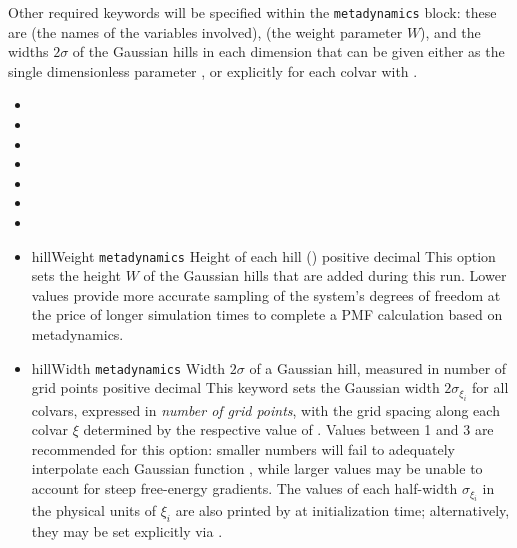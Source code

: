 Other required keywords will be specified within the \texttt{metadynamics} block: these are  (the names of the variables involved),  (the weight parameter $W$), and the widths $2\sigma$ of the Gaussian hills in each dimension that can be given either as the single dimensionless parameter , or explicitly for each colvar with .

\begin{itemize}

\item {}
\item {}
\item {}
\item {}
\item {}
\item {}
\item {}

\item %
  \key
    {hillWeight}{%
    \texttt{metadynamics}}{%
    Height of each hill (\energyunit)}{%
    positive decimal}{%
    This option sets the height $W$ of the Gaussian hills that are added during this run.
    Lower values provide more accurate sampling of the system's degrees of freedom at the price of longer simulation times to complete a PMF calculation based on metadynamics.}

\item %
  \key
    {hillWidth}{%
    \texttt{metadynamics}}{%
    Width $2\sigma$ of a Gaussian hill, measured in number of grid points}{%
    positive decimal}{%
    This keyword sets the Gaussian width $2\sigma_{\xi_{i}}$ for all colvars, expressed in \emph{number of grid points}, with the grid spacing along each colvar $\xi$ determined by the respective value of .
    Values between 1 and 3 are recommended for this option: smaller numbers will fail to adequately interpolate each Gaussian function \cite{Fiorin2013}, while larger values may be unable to account for steep free-energy gradients.
    The values of each half-width $\sigma_{\xi_{i}}$ in the physical units of $\xi_{i}$ are also printed by \MDENGINE{} at initialization time; alternatively, they may be set explicitly via .
    }


\end{itemize}
